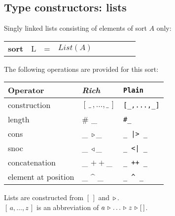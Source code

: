 \documentclass{article}
\makeatletter
\newcommand{\frm}[1]{\mbox{\ensuremath{#1}}}
\newcommand{\f}[1]{\ensuremath{\mathit{#1}}}
\newcommand{\fa}[2]{\ensuremath{\f{#1}(#2)}}
\newcommand{\lst}[1]{\ensuremath{[\,#1\,]}}
\newcommand{\el}{\ensuremath{[\,]}}
\newcommand{\cons}{\ensuremath{\hspace{0.12em}\triangleright\hspace{0.08em}}}
\newcommand{\snoc}{\ensuremath{\hspace{0.08em}\triangleleft\hspace{0.12em}}}
\newcommand{\concat}{\frm{+\!+}}
\newenvironment{genspect}%
{\par\bigskip\noindent%
 \begin{tabular}{@{}>{\bf}p{2.3em}L@{\ }L@{\ }L@{\ }L@{\ }L@{\ }L@{\ }L@{\ }L}%
}%
{\end{tabular}\bigskip\par%
}
\makeatother
\begin{document}
\begin{slidetop}
\section*{Type constructors: lists}

Singly linked lists consisting of elements of sort \frm{A} only:
\begin{genspect}
sort & L & = & \fa{List}{A}
\end{genspect}

\bigskip
The following operations are provided for this sort:
\begin{center}
\begin{tabular}{|l@{\qquad}L@{\qquad}l|}
\hline
Operator                       & \textit{Rich}          & \verb+Plain+\\\hline
construction                   & \lst{\_\,,\ldots,\_}   & \verb+[_,...,_]+\\
length                         & \# \_                  & \verb+#_+\\
cons                           & \_ \cons \_            & \verb+_ |> _+\\
snoc                           & \_ \snoc \_            & \verb+_ <| _+\\
concatenation                  & \_ \concat \_          & \verb-_ ++ _-\\
element at position            & \_ \mbox{\^{}} \_      & \verb+_ ^ _+\\
\hline
\end{tabular}
\end{center}

\bigskip
Lists are constructed from \frm{\el} and \frm{\cons}.\\
\frm{\lst{a, \ldots, z}} is an abbreviation of \frm{a \cons \ldots \cons z \cons \el}.
\end{slidetop}
\end{document}
